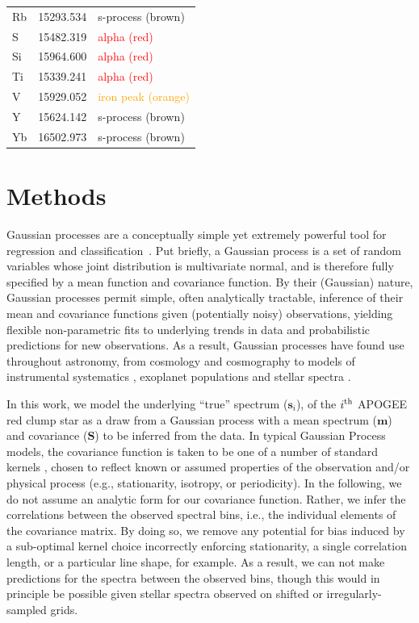 \documentclass[a4paper,fleqn,usenatbib]{mnras}
\newcommand{\specmean}{{\bm m}}
\newcommand{\speccov}{{\bm S}}
\newcommand{\objspec}{{\bm s}}
\begin{document}
\begin{table}
\begin{tabular}{lcl}
        Rb & 15293.534 & \textcolor{Sepia}{s-process (brown)} \\
        S & 15482.319 & \textcolor{red}{alpha (red)} \\
        Si & 15964.600 & \textcolor{red}{alpha (red)} \\
        Ti & 15339.241 & \textcolor{red}{alpha (red)} \\
        V & 15929.052 & \textcolor{orange}{iron peak (orange)} \\
        Y & 15624.142 & \textcolor{Sepia}{s-process (brown)} \\
        Yb & 16502.973 & \textcolor{Sepia}{s-process (brown)} \\
        \hline
    \end{tabular}
\end{table}


\section{Methods}
\label{sec:methods}

Gaussian processes are a conceptually simple yet extremely powerful tool for regression and classification~\citep{Rasmussen_Williams}. Put briefly, a Gaussian process is a set of random variables whose joint distribution is multivariate normal, and is therefore fully specified by a mean function and covariance function. By their (Gaussian) nature, Gaussian processes permit simple, often analytically tractable, inference of their mean and covariance functions given (potentially noisy) observations, yielding flexible non-parametric fits to underlying trends in data and probabilistic predictions for new observations. As a result, Gaussian processes have found use throughout astronomy, from cosmology \citep{Bond_etal:1987} and cosmography \citep{Shafieloo_etal:2012} to models of instrumental systematics \citep{Gibson_etal:2012}, exoplanet populations \citep{DFM_etal:2014} and stellar spectra \citep{Czekala_etal:2017}.

In this work, we model the underlying ``true'' spectrum ($\objspec_i$), of the $i^{\rm th}$ APOGEE red clump star as a draw from a Gaussian process with a mean spectrum ($\specmean$) and covariance ($\speccov$) to be inferred from the data. In typical Gaussian Process models, the covariance function is taken to be one of a number of standard kernels \citep{Rasmussen_Williams}, chosen to reflect known or assumed properties of the observation and/or physical process (e.g., stationarity, isotropy, or periodicity). In the following, we do not assume an analytic form for our covariance function. Rather, we infer the correlations between the observed spectral bins, i.e., the individual elements of the covariance matrix. By doing so, we remove any potential for bias induced by a sub-optimal kernel choice incorrectly enforcing stationarity, a single correlation length, or a particular line shape, for example. As a result, we can not make predictions for the spectra between the observed bins, though this would in principle be possible given stellar spectra observed on shifted or irregularly-sampled grids.
\end{document}
